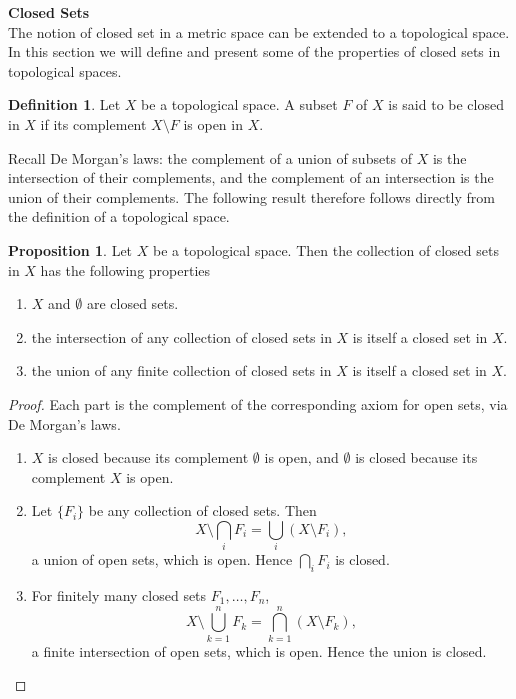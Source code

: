 \documentclass[11pt,a4paper]{article}
\theoremstyle{definition}
\newtheorem{defn}[thm]{Definition}
\newtheorem{prop}[thm]{Proposition}
\begin{document}
\textbf{Closed Sets}\\
The notion of closed set in a metric space can be extended to a topological space. In this section we will define and present some of the properties of closed sets in topological spaces.



\begin{defn}
Let $X$ be a topological space. A subset $F$ of $X$ is said to be closed in $X$ if its complement $X\setminus F$ is open in $X$.
\end{defn}

Recall De Morgan's laws: the complement of a union of subsets of $X$ is the intersection of their complements, and the complement of an intersection is the union of their complements. The following result therefore follows directly from the definition of a topological space.



\begin{prop}
Let $X$ be a topological space. Then the collection of closed sets in $X$ has the following properties
\begin{enumerate}
\item[i] $X$ and $\emptyset$ are closed sets.
\item[ii] the intersection of any collection of closed sets in $X$ is itself a closed set in $X$.
\item[iii] the union of any finite collection of closed sets in $X$ is itself a closed set in $X$.
\end{enumerate}
\end{prop}


\begin{proof}
Each part is the complement of the corresponding axiom for open sets, via De
Morgan's laws.
\begin{enumerate}
\item[(i)] $X$ is closed because its complement $\emptyset$ is open, and $\emptyset$ is
closed because its complement $X$ is open.

\item[(ii)] Let $\{F_i\}$ be any collection of closed sets. Then
$$X\setminus\bigcap_i F_i = \bigcup_i \left(X\setminus F_i\right),$$
a union of open sets, which is open. Hence $\bigcap_i F_i$ is closed.

\item[(iii)] For finitely many closed sets $F_1,\dots,F_n$,
$$X\setminus\bigcup_{k=1}^{n}F_k = \bigcap_{k=1}^{n}\left(X\setminus F_k\right),$$
a finite intersection of open sets, which is open. Hence the union is closed.
\end{enumerate}
\end{proof}
\end{document}
